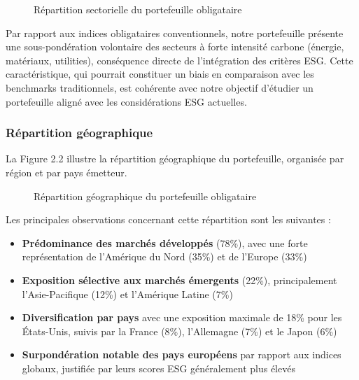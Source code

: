 \begin{figure}[h]
\centering
\caption{Répartition sectorielle du portefeuille obligataire}
\end{figure}

Par rapport aux indices obligataires conventionnels, notre portefeuille présente une sous-pondération volontaire des secteurs à forte intensité carbone (énergie, matériaux, utilities), conséquence directe de l'intégration des critères ESG. Cette caractéristique, qui pourrait constituer un biais en comparaison avec les benchmarks traditionnels, est cohérente avec notre objectif d'étudier un portefeuille aligné avec les considérations ESG actuelles.

\subsubsection{Répartition géographique}

La Figure 2.2 illustre la répartition géographique du portefeuille, organisée par région et par pays émetteur.

\begin{figure}[h]
\centering
\caption{Répartition géographique du portefeuille obligataire}
\end{figure}

Les principales observations concernant cette répartition sont les suivantes :

\begin{itemize}
    \item \textbf{Prédominance des marchés développés} (78\%), avec une forte représentation de l'Amérique du Nord (35\%) et de l'Europe (33\%)
    
    \item \textbf{Exposition sélective aux marchés émergents} (22\%), principalement l'Asie-Pacifique (12\%) et l'Amérique Latine (7\%)
    
    \item \textbf{Diversification par pays} avec une exposition maximale de 18\% pour les États-Unis, suivis par la France (8\%), l'Allemagne (7\%) et le Japon (6\%)
    
    \item \textbf{Surpondération notable des pays européens} par rapport aux indices globaux, justifiée par leurs scores ESG généralement plus élevés
\end{itemize}

